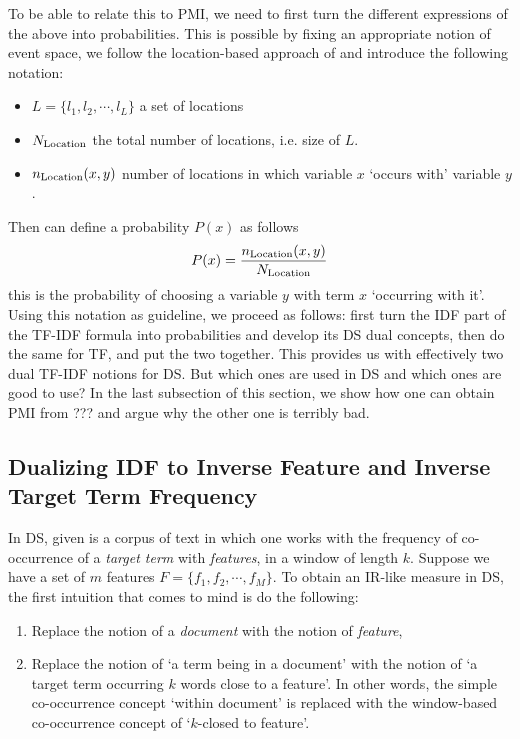 To be able to relate this to PMI, we need to first turn the different expressions of the above into probabilities.  This is possible by fixing an appropriate notion of event space, we follow the location-based approach of \cite{ThomasBook} and introduce the following notation:

\begin{itemize}
\item $L = \{l_1, l_2, \cdots, l_L\}$ a set of locations
\item $N_{\textmd{Location}}$ the total number of locations, i.e. size  of $L$.
\item $n_{\textmd{Location}} (x,y)$ number of locations in which variable $x$ `occurs with' variable $y$.
\end{itemize}

Then can define a probability $P(x)$ as follows
\[
P(x) = \frac{n_{\textmd{Location}}(x,y)}{N_{\textmd{Location}}}
\]
 this is  the probability of choosing a variable $y$ with term $x$ `occurring with it'.  Using this notation as guideline, we proceed as follows:   first turn the IDF part of the TF-IDF formula into probabilities and develop its DS dual concepts, then do the same for TF, and  put the two together.  This provides us with effectively two dual TF-IDF notions for DS.  But which ones are used in DS and which ones are good to use? In the last subsection of this section, we show how one can obtain PMI from ??? and argue why the other  one is terribly bad. 


\subsection{Dualizing  IDF to Inverse Feature  and Inverse Target Term Frequency }
\label{subsec-IDF}


\medskip
In DS, given is a corpus of text in which one works with the frequency of co-occurrence of a \emph{target term} with \emph{features}, in a window of length $k$.  Suppose we have a set of  $m$ features  $F = \{f_1, f_2, \cdots, f_M\}$.  To obtain an IR-like measure in DS, the first intuition that comes to mind is do the following:

\begin{enumerate}
\item   Replace the notion of a  \emph{document}  with the notion of  \emph{feature}, 
\item  Replace the notion of `a term being in a document'  with the notion of `a target  term occurring $k$ words close to a feature'.  In other words,  the  simple co-occurrence concept `within document' is replaced with the window-based co-occurrence concept of  `$k$-closed to feature'. 
\end{enumerate}

